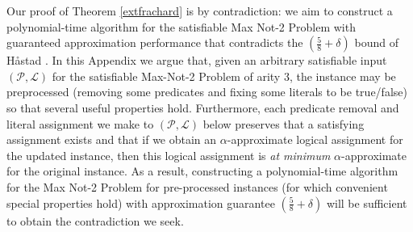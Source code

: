 \documentclass{article}
\begin{document}
Our proof of Theorem \ref{extfrachard} is by contradiction: we aim to construct a polynomial-time algorithm for the satisfiable Max Not-2 Problem with guaranteed approximation performance that contradicts the $(\frac{5}{8}+\delta)$ bound of H{\aa}stad \cite{hast14}. In this Appendix we argue that, given an arbitrary satisfiable input $(\mathcal{P}, \mathcal{L})$ for the satisfiable Max-Not-2 Problem of arity 3, the instance may be preprocessed (removing some predicates and fixing some literals to be true/false) so that several useful properties hold. 
Furthermore, each predicate removal and literal assignment we make to $(\mathcal{P}, \mathcal{L})$ below preserves that a satisfying assignment exists and that if we obtain an $\alpha$-approximate logical assignment for the updated instance, then this logical assignment is \emph{at minimum} $\alpha$-approximate for the original instance. As a result, constructing a polynomial-time algorithm for the Max Not-2 Problem for pre-processed instances (for which convenient special properties hold) with approximation guarantee $(\frac{5}{8}+\delta)$ will be sufficient to obtain the contradiction we seek.
\end{document}
